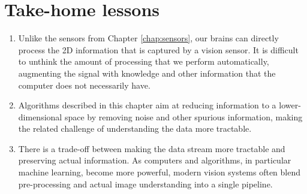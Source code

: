\section*{Take-home lessons}
\begin{enumerate}
\item Unlike the sensors from Chapter \ref{chap:sensors}, our brains can directly process the 2D information that is captured by a vision sensor. It is difficult to unthink the amount of processing that we perform automatically, augmenting the signal with knowledge and other information that the computer does not necessarily have.
\item  Algorithms described in this chapter aim at reducing information to a lower-dimensional space by removing noise and other spurious information, making the related challenge of understanding the data more tractable. 
\item There is a trade-off between making the data stream more tractable and preserving actual information. As computers and algorithms, in particular machine learning, become more powerful, modern vision systems often blend pre-processing and actual image understanding into a single pipeline. 
\end{enumerate}



